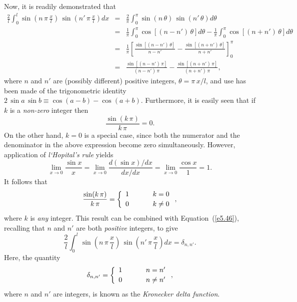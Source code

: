 Now, it is readily demonstrated that
\begin{eqnarray}
\frac{2}{l}\int_0^l\sin\left(n\,\pi\,\frac{x}{l}\right)\,\sin\left(n'\,\pi\,\frac{x}{l}\right)dx&=&\frac{2}{\pi}\int_0^\pi \sin\left(n\,\theta\right)\,\sin\left(n'\,\theta\right)d\theta\nonumber\\[0.5ex]
&=&
\frac{1}{\pi}\int_0^\pi \cos\left[(n-n')\,\theta\right]d\theta-\frac{1}{\pi}\int_0^\pi\cos\left[(n+n')\,\theta\right] d\theta\nonumber\\[0.5ex]
&=&\frac{1}{\pi}\left[\frac{\sin\left[(n-n')\,\theta\right]}{n-n'}\right.-\left.
\frac{\sin\left[(n+n')\,\theta\right]}{n+n'}\right]_0^{\pi}\nonumber\\[0.5ex]
&=&\frac{\sin\left[(n-n')\,\pi\right]}{(n-n')\,\pi}-
\frac{\sin\left[(n+n')\,\pi\right]}{(n+n')\,\pi},\label{e5.46}
\end{eqnarray}
where $n$ and $n'$ are (possibly different) positive integers, $\theta=\pi\,x/l$,
and use has been made of the trigonometric identity $2\,\sin a\,\sin b \equiv \cos(a-b)-\cos(a+b)$.   Furthermore, it is easily seen that if $k$ is a {\em non-zero}\/ integer then
\begin{equation}
\frac{\sin(k\,\pi)}{k\,\pi} =0.
\end{equation}
On the other hand, $k=0$ is a special case, since both the
numerator and the denominator  in the above expression become zero simultaneously.  However, application of  {\em l`Hopital's rule}\/ yields
\begin{equation}
\lim_{x\rightarrow 0} \frac{\sin x}{x} = \lim_{x\rightarrow 0} \frac{d(\sin x)/dx}{dx/dx}
= \lim_{x\rightarrow 0} \frac{\cos x}{1} = 1.
\end{equation}
It follows that
\begin{equation}
\frac{\sin(k\,\pi)}{k\,\pi} = \left\{
\begin{array}{ccc}
1 &\mbox{\hspace{0.5cm}}&k=0\\[0.5ex]
0&&k\neq 0
\end{array}\right.,
\end{equation}
where $k$ is {\em any}\/ integer. This result can be combined with Equation~(\ref{e5.46}),
recalling that $n$ and $n'$ are both {\em positive}\/ integers, to give
\begin{equation}\label{e5.50}
\frac{2}{l}\int_0^l\sin\left(n\,\pi\,\frac{x}{l}\right)\,\sin\left(n'\,\pi\,\frac{x}{l}\right)dx
= \delta_{n,n'}.
\end{equation}
Here, the quantity
\begin{equation}\label{e5.51}
\delta_{n,n'} = \left\{
\begin{array}{ccc}
1 &\mbox{\hspace{0.5cm}}&n=n'\\[0.5ex]
0&&n\neq n'
\end{array}\right.,
\end{equation}
where $n$ and $n'$ are integers, is known as the {\em Kronecker delta function}.

